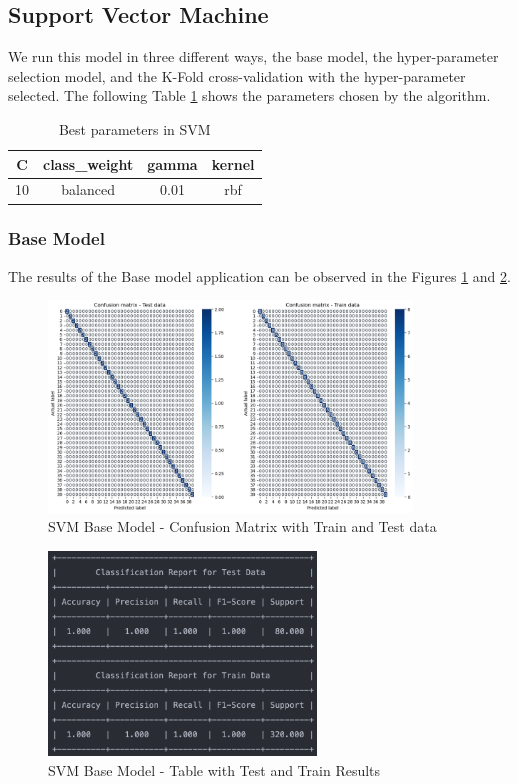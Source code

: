 \documentclass[conference]{IEEEtran}
\begin{document}

\subsection{Support Vector Machine}

We run this model in three different ways, the base model, the hyper-parameter selection model, and the K-Fold cross-validation with the hyper-parameter selected. The following Table \ref{tab:tab-svc} shows the parameters chosen by the algorithm.

\begin{table}[ht!]
    \centering
    \caption{Best parameters in SVM} 
    \begin{tabular}{||c c c c||} 
     \hline
     C & class\_weight & gamma & kernel \\ [0.5ex] 
     \hline\hline
     10 & balanced & 0.01 & rbf \\ 
    \hline
    \end{tabular}
    \label{tab:tab-svc}
\end{table}
\subsubsection{Base Model}
The results of the Base model application can be observed in the Figures \ref{fig:conf_svm_1} and \ref{fig:conf_svm_r_1}. 

\begin{figure}[H]
    \centering
    \includegraphics[width=3.8in]{SVC/1.png}%
    \caption{SVM Base Model - Confusion Matrix with Train and Test data}%
    \label{fig:conf_svm_1}%
\end{figure}

\begin{figure}[H]
    \centering
    \includegraphics[width=2.8in]{SVC/r_1.png}%
    \caption{SVM Base Model - Table with Test and Train Results}%
    \label{fig:conf_svm_r_1}%
\end{figure}
\end{document}
